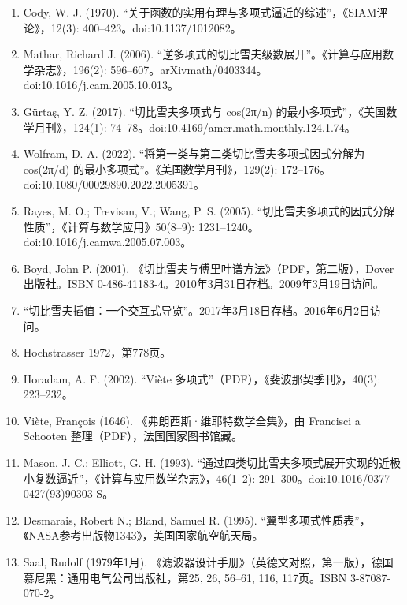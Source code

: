 \begin{enumerate}
\item Cody, W. J. (1970). “关于函数的实用有理与多项式逼近的综述”，《SIAM评论》，12(3): 400–423。doi:10.1137/1012082。
\item Mathar, Richard J. (2006). “逆多项式的切比雪夫级数展开”。《计算与应用数学杂志》，196(2): 596–607。arXiv\:math/0403344。doi:10.1016/j.cam.2005.10.013。
\item Gürtaş, Y. Z. (2017). “切比雪夫多项式与 cos(2π/n) 的最小多项式”，《美国数学月刊》，124(1): 74–78。doi:10.4169/amer.math.monthly.124.1.74。
\item Wolfram, D. A. (2022). “将第一类与第二类切比雪夫多项式因式分解为 cos(2π/d) 的最小多项式”。《美国数学月刊》，129(2): 172–176。doi:10.1080/00029890.2022.2005391。
\item Rayes, M. O.; Trevisan, V.; Wang, P. S. (2005). “切比雪夫多项式的因式分解性质”，《计算与数学应用》50(8–9): 1231–1240。doi:10.1016/j.camwa.2005.07.003。
\item Boyd, John P. (2001). 《切比雪夫与傅里叶谱方法》（PDF，第二版），Dover出版社。ISBN 0-486-41183-4。2010年3月31日存档。2009年3月19日访问。
\item “切比雪夫插值：一个交互式导览”。2017年3月18日存档。2016年6月2日访问。
\item Hochstrasser 1972，第778页。
\item Horadam, A. F. (2002). “Viète 多项式”（PDF），《斐波那契季刊》，40(3): 223–232。
\item Viète, François (1646). 《弗朗西斯·维耶特数学全集》，由 Francisci a Schooten 整理（PDF），法国国家图书馆藏。
\item Mason, J. C.; Elliott, G. H. (1993). “通过四类切比雪夫多项式展开实现的近极小复数逼近”，《计算与应用数学杂志》，46(1–2): 291–300。doi:10.1016/0377-0427(93)90303-S。
\item Desmarais, Robert N.; Bland, Samuel R. (1995). “翼型多项式性质表”，《NASA参考出版物1343》，美国国家航空航天局。
\item Saal, Rudolf (1979年1月). 《滤波器设计手册》（英德文对照，第一版），德国慕尼黑：通用电气公司出版社，第25, 26, 56–61, 116, 117页。ISBN 3-87087-070-2。
\end{enumerate}

